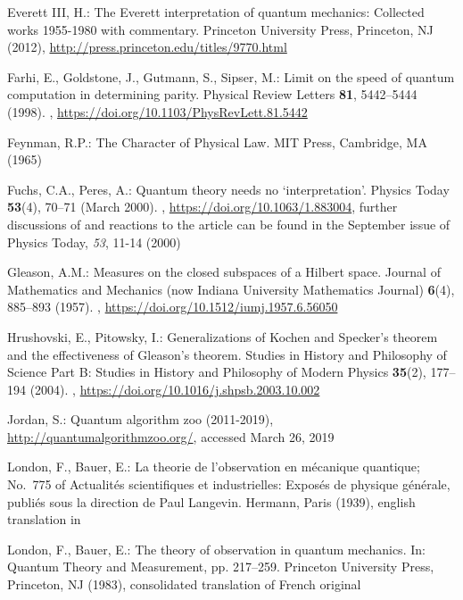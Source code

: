 \documentclass[runningheads]{llncs}
\begin{document}
\begin{thebibliography}{10}
{Everett III}, H.: The {E}verett interpretation of quantum mechanics: Collected
  works 1955-1980 with commentary. Princeton University Press, Princeton, NJ
  (2012), \url{http://press.princeton.edu/titles/9770.html}

Farhi, E., Goldstone, J., Gutmann, S., Sipser, M.: Limit on the speed of
  quantum computation in determining parity. Physical Review Letters
  \textbf{81},  5442--5444 (1998). ,
  \url{https://doi.org/10.1103/PhysRevLett.81.5442}

Feynman, R.P.: The Character of Physical Law. MIT Press, Cambridge, MA (1965)

Fuchs, C.A., Peres, A.: Quantum theory needs no `interpretation'. Physics Today
   \textbf{53}(4),  70--71 (March 2000). ,
  \url{https://doi.org/10.1063/1.883004}, further discussions of and reactions
  to the article can be found in the September issue of Physics Today, {\it
  53}, 11-14 (2000)

Gleason, A.M.: Measures on the closed subspaces of a {H}ilbert space. Journal
  of Mathematics and Mechanics (now Indiana University Mathematics Journal)
  \textbf{6}(4),  885--893 (1957). ,
  \url{https://doi.org/10.1512/iumj.1957.6.56050}

Hrushovski, E., Pitowsky, I.: Generalizations of {K}ochen and {S}pecker's
  theorem and the effectiveness of {G}leason's theorem. Studies in History and
  Philosophy of Science Part B: Studies in History and Philosophy of Modern
  Physics  \textbf{35}(2),  177--194 (2004). ,
  \url{https://doi.org/10.1016/j.shpsb.2003.10.002}

Jordan, S.: Quantum algorithm zoo (2011-2019),
  \url{http://quantumalgorithmzoo.org/}, accessed March 26, 2019

London, F., Bauer, E.: La theorie de l'observation en m\'ecanique quantique;
  {N}o.~775 of Actualit\'es scientifiques et industrielles: Expos\'es de
  physique g\'en\'erale, publi\'es sous la direction de {P}aul {L}angevin.
  Hermann, Paris (1939), english translation in~\cite{london-Bauer-1983}

London, F., Bauer, E.: The theory of observation in quantum mechanics. In:
  Quantum Theory and Measurement, pp. 217--259. Princeton University Press,
  Princeton, NJ (1983), consolidated translation of French
  original~\cite{london-Bauer-1939}


\end{thebibliography}
\end{document}
